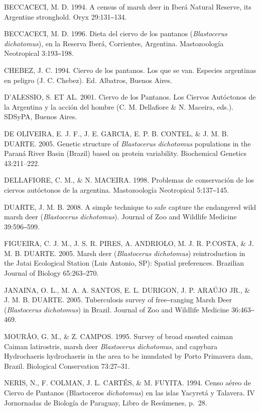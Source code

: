 \documentclass[
  x11names]{article}
\begin{document}
BECCACECI, M. D. 1994. A census of marsh deer in Iberá Natural Reserve,
its Argentine stronghold. Oryx 29:131‒134.

BECCACECI, M. D. 1996. Dieta del ciervo de los pantanos
(\textit{Blastocerus} \textit{dichotomus}), en la Reserva Iberá,
Corrientes, Argentina. Mastozoología Neotropical 3:193‒198.

CHEBEZ, J. C. 1994. Ciervo de los pantanos. Los que se van. Especies
argentinas en peligro (J. C. Chebez). Ed. Albatros, Buenos Aires.

D'ALESSIO, S. ET AL. 2001. Ciervo de los Pantanos. Los Ciervos
Autóctonos de la Argentina y la acción del hombre (C. M. Dellafiore \&
N. Maceira, eds.). SDSyPA, Buenos Aires.

DE OLIVEIRA, E. J. F., J. E. GARCIA, E. P. B. CONTEL, \& J. M. B.
DUARTE. 2005. Genetic structure of \textit{Blastocerus}
\textit{dichotomus} populations in the Paraná River Basin (Brazil) based
on protein variability. Biochemical Genetics 43:211--222.

DELLAFIORE, C. M., \& N. MACEIRA. 1998. Problemas de conservación de los
ciervos autóctonos de la argentina. Mastozoología Neotropical 5:137‒145.

DUARTE, J. M. B. 2008. A simple technique to safe capture the endangered
wild marsh deer (\textit{Blastocerus} \textit{dichotomus}). Journal of
Zoo and Wildlife Medicine 39:596‒599.

FIGUEIRA, C. J. M., J. S. R. PIRES, A. ANDRIOLO, M. J. R. P.COSTA, \& J.
M. B. DUARTE. 2005. Marsh deer (\textit{Blastocerus}
\textit{dichotomus}) reintroduction in the Jatai Ecological Station
(Luis Antonio, SP): Spatial preferences. Brazilian Journal of Biology
65:263‒270.

JANAINA, O. L., M. A. A. SANTOS, E. L. DURIGON, J. P. ARAÚJO JR., \& J.
M. B. DUARTE. 2005. Tuberculosis survey of free‒ranging Marsh Deer
(\textit{Blastocerus} \textit{dichotomus}) in Brazil. Journal of Zoo and
Wildlife Medicine 36:463‒469.

MOURÃO, G. M., \& Z. CAMPOS. 1995. Survey of broad snouted caiman Caiman
latirostris, marsh deer \textit{Blastocerus} \textit{dichotomus}, and
capybara Hydrochaeris hydrochaeris in the area to be inundated by Porto
Primavera dam, Brazil. Biological Conservation 73:27‒31.

NERIS, N., F. COLMAN, J. L. CARTÉS, \& M. FUYITA. 1994. Censo aéreo de
Ciervo de Pantanos (Blastoceros \textit{dichotomus}) en las islas
Yacyretá y Talavera. IV Jornornadas de Biología de Paraguay, Libro de
Resúmenes, p.~28.
\end{document}
